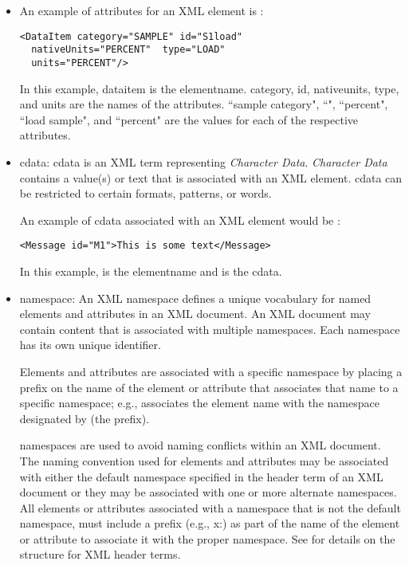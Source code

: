 \begin{itemize}
\item An example of attributes for an XML element is :

\begin{lstlisting}[firstnumber=1,escapechar=|,%
    caption={Example of  attributes for an element}, label={lst:attributes-for-an-element}]
<DataItem category="SAMPLE" id="S1load"
  nativeUnits="PERCENT"  type="LOAD"
  units="PERCENT"/>
\end{lstlisting}

In this example, \gls{dataitem} is the \gls{elementname}.  \gls{category}, \gls{id}, \gls{nativeunits}, \gls{type}, and \gls{units} are the names of the attributes.  “\gls{sample category}", “", “\gls{percent}", “\gls{load sample}", and “\gls{percent}" are the values for each of the respective attributes.

\item \gls{cdata}:  \gls{cdata} is an XML term representing \textit{Character Data}. \textit{Character Data} contains a value(s) or text that is associated with an XML element.  \gls{cdata} can be restricted to certain formats, patterns, or words.  

An example of \gls{cdata} associated with an XML element would be :

\begin{lstlisting}[firstnumber=1,escapechar=|,%
    caption={Example of cdata associated with element}, label={lst:cdata-associated-with-element}]
<Message id="M1">This is some text</Message>
\end{lstlisting}

In this example,  is the \gls{elementname} and  is the \gls{cdata}.

\item \gls{namespace}:  An XML \gls{namespace} defines a unique vocabulary for named elements and attributes in an XML document.  An XML document may contain content that is associated with multiple \glspl{namespace}.  Each \gls{namespace} has its own unique identifier. 

Elements and attributes are associated with a specific \gls{namespace} by placing a prefix on the name of the element or attribute that associates that name to a specific \gls{namespace}; e.g.,  associates the element name  with the \gls{namespace} designated by  (the prefix).

\glspl{namespace} are used to avoid naming conflicts within an XML document.  The naming convention used for elements and attributes may be associated with either the default \gls{namespace} specified in the \gls{header term} of an XML document or they may be associated with one or more alternate \glspl{namespace}.  All elements or attributes associated with a \gls{namespace} that is not the default \gls{namespace}, must include a prefix (e.g., x:) as part of the name of the element or attribute to associate it with the proper \gls{namespace}.  See  for details on the structure for XML \glspl{header term}.


\end{itemize}
